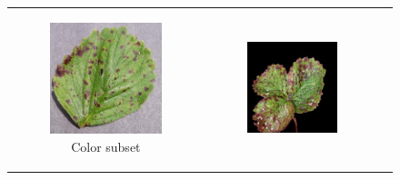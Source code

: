 \documentclass{BachelorBUI}
\begin{document}
        \begin{figure}[h]
            \centering
            \begin{tabular}{ccc}
                \begin{subfigure}[t]{0.30\textwidth}
                    \centering
                    \includegraphics[width=\textwidth]{color_strawberry_leaf_scorch.JPG}
                    \caption{\centering Color subset}
                \end{subfigure} &
                \begin{subfigure}[t]{0.30\textwidth}
                    \centering
                    \includegraphics[width=\textwidth]{segmented_strawberry_leaf_scorch.jpg}

\end{subfigure}
\end{tabular}
\end{figure}
\end{document}
